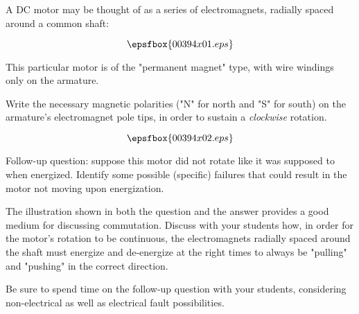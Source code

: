 

A DC motor may be thought of as a series of electromagnets, radially spaced around a common shaft:

$$\epsfbox{00394x01.eps}$$

This particular motor is of the "permanent magnet" type, with wire windings only on the armature.

Write the necessary magnetic polarities ("N" for north and "S" for south) on the armature's electromagnet pole tips, in order to sustain a {\it clockwise} rotation.







$$\epsfbox{00394x02.eps}$$

\vskip 10pt

Follow-up question: suppose this motor did not rotate like it was supposed to when energized.  Identify some possible (specific) failures that could result in the motor not moving upon energization.







The illustration shown in both the question and the answer provides a good medium for discussing commutation.  Discuss with your students how, in order for the motor's rotation to be continuous, the electromagnets radially spaced around the shaft must energize and de-energize at the right times to always be "pulling" and "pushing" in the correct direction.

Be sure to spend time on the follow-up question with your students, considering non-electrical as well as electrical fault possibilities.




